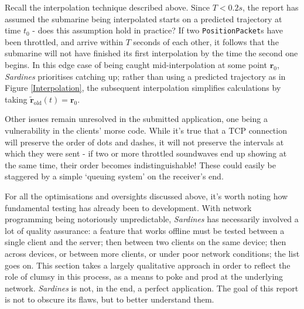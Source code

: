 \documentclass[a4paper, 9pt]{article}
\begin{document}
\begin{flushleft}
\vspace{5pt}\noindent
Recall the interpolation technique described above. Since $T < 0.2s$, the report has assumed the submarine being interpolated starts on a predicted trajectory at time $t_0$ - does this assumption hold in practice? If two \texttt{PositionPacket}s have been throttled, and arrive within $T$ seconds of each other, it follows that the submarine will not have finished its first interpolation by the time the second one begins. In this edge case of being caught mid-interpolation at some point $\mathbf{r}_0$, \textit{Sardines} prioritises catching up; rather than using a predicted trajectory as in Figure \ref{Interpolation}, the subsequent interpolation simplifies calculations by taking $\mathbf{\tilde{r}}_{\textrm{old}}(t) = \mathbf{r}_0$.

\vspace{5pt}\noindent
Other issues remain unresolved in the submitted application, one being a vulnerability in the clients' morse code. While it's true that a TCP connection will preserve the order of dots and dashes, it will not preserve the intervals at which they were sent - if two or more throttled soundwaves end up showing at the same time, their order becomes indistinguishable! These could easily be staggered by a simple `queuing system' on the receiver's end.

\vspace{5pt}\noindent
For all the optimisations and oversights discussed above, it's worth noting how fundamental testing has already been to development. With network programming being notoriously unpredictable, \textit{Sardines} has necessarily involved a lot of quality assurance: a feature that works offline must be tested between a single client and the server; then between two clients on the same device; then across devices, or between more clients, or under poor network conditions; the list goes on. This section takes a largely qualitative approach in order to reflect the role of clumsy in this process, as a means to poke and prod at the underlying network. \textit{Sardines} is not, in the end, a perfect application. The goal of this report is not to obscure its flaws, but to better understand them.



\end{flushleft}
\end{document}
